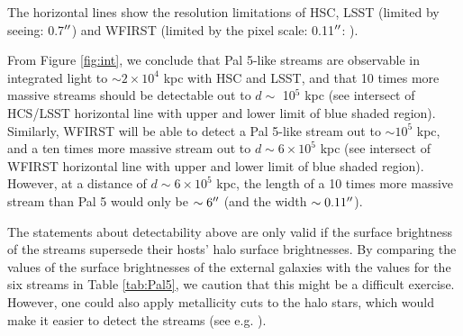 \documentclass[twocolumn]{aastex62}
\begin{document}
The horizontal lines show the resolution limitations of HSC, LSST (limited by seeing: 0.7$\mbox{$^{\prime\prime}$}$) and WFIRST (limited by the pixel scale: 0.11$\mbox{$^{\prime\prime}$}$: \citealt{spergel13}).

From Figure \ref{fig:int}, we conclude that Pal 5-like streams are observable in integrated light to $\sim 2\times 10^4$ kpc with HSC and LSST, and that 10 times more massive streams should be detectable out to $ d \sim$ 10$^5$ kpc (see intersect of HCS/LSST horizontal line with upper and lower limit of blue shaded region). Similarly, WFIRST will be able to detect a Pal 5-like stream out to $\sim 10^5$ kpc, and a ten times more massive stream out to $d \sim 6 \times 10^5$ kpc (see intersect of WFIRST horizontal line with upper and lower limit of blue shaded region). However, at a distance of $d \sim 6 \times 10^5$ kpc, the length of a 10 times more massive stream than Pal 5 would only be $\sim 6 \mbox{$^{\prime\prime}$}$ (and the width $\sim 0.11\mbox{$^{\prime\prime}$}$). 

The statements about detectability above are only valid if the surface brightness of the streams supersede their hosts' halo surface brightnesses. By comparing the values of the surface brightnesses of the external galaxies with the values for the six streams in Table \ref{tab:Pal5}, we caution that this might be a difficult exercise. However, one could also apply metallicity cuts to the halo stars, which would make it easier to detect the streams (see e.g. \citealt{ibata14}).






\end{document}
